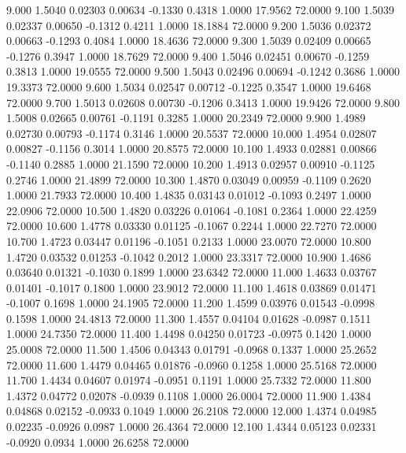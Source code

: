    9.000   1.5040   0.02303   0.00634  -0.1330   0.4318   1.0000  17.9562  72.0000
   9.100   1.5039   0.02337   0.00650  -0.1312   0.4211   1.0000  18.1884  72.0000
   9.200   1.5036   0.02372   0.00663  -0.1293   0.4084   1.0000  18.4636  72.0000
   9.300   1.5039   0.02409   0.00665  -0.1276   0.3947   1.0000  18.7629  72.0000
   9.400   1.5046   0.02451   0.00670  -0.1259   0.3813   1.0000  19.0555  72.0000
   9.500   1.5043   0.02496   0.00694  -0.1242   0.3686   1.0000  19.3373  72.0000
   9.600   1.5034   0.02547   0.00712  -0.1225   0.3547   1.0000  19.6468  72.0000
   9.700   1.5013   0.02608   0.00730  -0.1206   0.3413   1.0000  19.9426  72.0000
   9.800   1.5008   0.02665   0.00761  -0.1191   0.3285   1.0000  20.2349  72.0000
   9.900   1.4989   0.02730   0.00793  -0.1174   0.3146   1.0000  20.5537  72.0000
  10.000   1.4954   0.02807   0.00827  -0.1156   0.3014   1.0000  20.8575  72.0000
  10.100   1.4933   0.02881   0.00866  -0.1140   0.2885   1.0000  21.1590  72.0000
  10.200   1.4913   0.02957   0.00910  -0.1125   0.2746   1.0000  21.4899  72.0000
  10.300   1.4870   0.03049   0.00959  -0.1109   0.2620   1.0000  21.7933  72.0000
  10.400   1.4835   0.03143   0.01012  -0.1093   0.2497   1.0000  22.0906  72.0000
  10.500   1.4820   0.03226   0.01064  -0.1081   0.2364   1.0000  22.4259  72.0000
  10.600   1.4778   0.03330   0.01125  -0.1067   0.2244   1.0000  22.7270  72.0000
  10.700   1.4723   0.03447   0.01196  -0.1051   0.2133   1.0000  23.0070  72.0000
  10.800   1.4720   0.03532   0.01253  -0.1042   0.2012   1.0000  23.3317  72.0000
  10.900   1.4686   0.03640   0.01321  -0.1030   0.1899   1.0000  23.6342  72.0000
  11.000   1.4633   0.03767   0.01401  -0.1017   0.1800   1.0000  23.9012  72.0000
  11.100   1.4618   0.03869   0.01471  -0.1007   0.1698   1.0000  24.1905  72.0000
  11.200   1.4599   0.03976   0.01543  -0.0998   0.1598   1.0000  24.4813  72.0000
  11.300   1.4557   0.04104   0.01628  -0.0987   0.1511   1.0000  24.7350  72.0000
  11.400   1.4498   0.04250   0.01723  -0.0975   0.1420   1.0000  25.0008  72.0000
  11.500   1.4506   0.04343   0.01791  -0.0968   0.1337   1.0000  25.2652  72.0000
  11.600   1.4479   0.04465   0.01876  -0.0960   0.1258   1.0000  25.5168  72.0000
  11.700   1.4434   0.04607   0.01974  -0.0951   0.1191   1.0000  25.7332  72.0000
  11.800   1.4372   0.04772   0.02078  -0.0939   0.1108   1.0000  26.0004  72.0000
  11.900   1.4384   0.04868   0.02152  -0.0933   0.1049   1.0000  26.2108  72.0000
  12.000   1.4374   0.04985   0.02235  -0.0926   0.0987   1.0000  26.4364  72.0000
  12.100   1.4344   0.05123   0.02331  -0.0920   0.0934   1.0000  26.6258  72.0000
